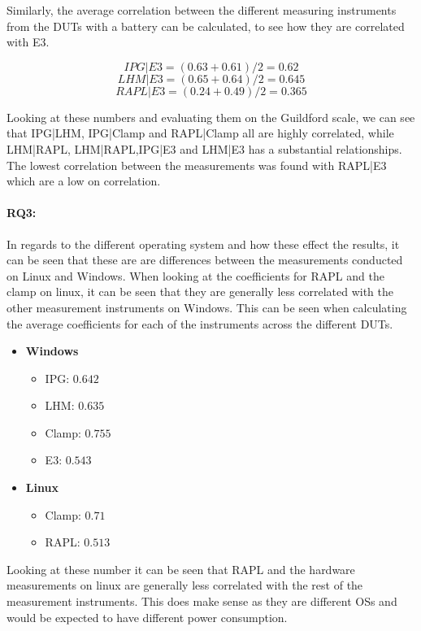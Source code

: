 Similarly, the average correlation between the different measuring instruments from the DUTs with a battery can be calculated, to see how they are correlated with E3.

$$IPG|E3 = (0.63+0.61)/2 = 0.62$$
$$LHM|E3 = (0.65+0.64)/2 = 0.645$$
$$RAPL|E3 = (0.24+0.49)/2 = 0.365$$

Looking at these numbers and evaluating them on the Guildford scale, we can see that IPG|LHM, IPG|Clamp and RAPL|Clamp all are highly correlated, while LHM|RAPL, LHM|RAPL,IPG|E3 and LHM|E3 has a substantial relationships. The lowest correlation between the measurements was found with RAPL|E3 which are a low on correlation.

\paragraph{RQ3:} In regards to the different operating system and how these effect the results, it can be seen that these are are differences between the measurements conducted on Linux and Windows. When looking at the coefficients for RAPL and the clamp on linux, it can be seen that they are generally less correlated with the other measurement instruments on Windows. This can be seen when calculating the average coefficients for each of the instruments across the different DUTs.

\begin{itemize}
    \item \textbf{Windows}
    \begin{itemize}
        \item IPG: $0.642$ %
        \item LHM: $0.635$ %
        \item Clamp: $0.755$ %
        \item E3: $0.543$ %
    \end{itemize}
    \item \textbf{Linux}
    \begin{itemize}
        \item Clamp: $0.71$ %
        \item RAPL: $0.513$ %
    \end{itemize}
\end{itemize}

Looking at these number it can be seen that RAPL and the hardware measurements on linux are generally less correlated with the rest of the measurement instruments. This does make sense as they are different OSs and would be expected to have different power consumption.

